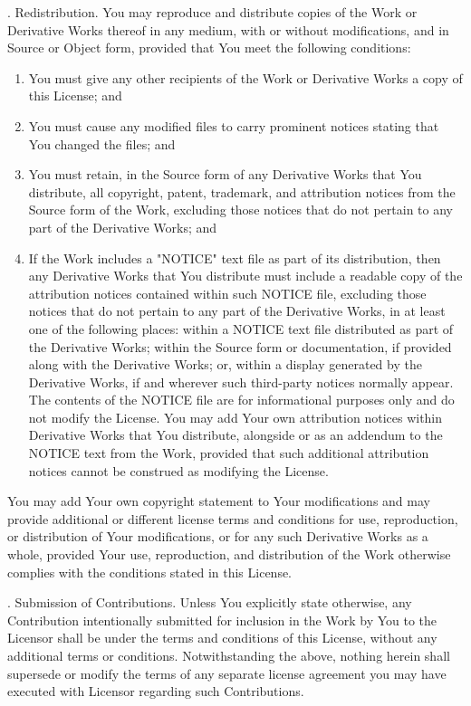 \bigskip
{}. Redistribution. You may reproduce and distribute copies of the Work or Derivative Works thereof in any medium, with or without modifications, and in Source or Object form, provided that You meet the following conditions:

\begin{enumerate}
  \item 
    You must give any other recipients of the Work or Derivative Works a copy of this License; and
 \item    You must cause any modified files to carry prominent notices stating that You changed the files; and
 \item    You must retain, in the Source form of any Derivative Works that You distribute, all copyright, patent, trademark, and attribution notices from the Source form of the Work, excluding those notices that do not pertain to any part of the Derivative Works; and
 \item    If the Work includes a "NOTICE" text file as part of its distribution, then any Derivative Works that You distribute must include a readable copy of the attribution notices contained within such NOTICE file, excluding those notices that do not pertain to any part of the Derivative Works, in at least one of the following places: within a NOTICE text file distributed as part of the Derivative Works; within the Source form or documentation, if provided along with the Derivative Works; or, within a display generated by the Derivative Works, if and wherever such third-party notices normally appear. The contents of the NOTICE file are for informational purposes only and do not modify the License. You may add Your own attribution notices within Derivative Works that You distribute, alongside or as an addendum to the NOTICE text from the Work, provided that such additional attribution notices cannot be construed as modifying the License.
\end{enumerate}

\noindent     You may add Your own copyright statement to Your modifications and may provide additional or different license terms and conditions for use, reproduction, or distribution of Your modifications, or for any such Derivative Works as a whole, provided Your use, reproduction, and distribution of the Work otherwise complies with the conditions stated in this License.

\bigskip
{}. Submission of Contributions. Unless You explicitly state otherwise, any Contribution intentionally submitted for inclusion in the Work by You to the Licensor shall be under the terms and conditions of this License, without any additional terms or conditions. Notwithstanding the above, nothing herein shall supersede or modify the terms of any separate license agreement you may have executed with Licensor regarding such Contributions.


